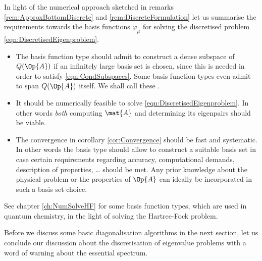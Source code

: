\begin{rem}
	\label{rem:ChoiceBasisFunction}
In light of the numerical approach sketched in
remarks \ref{rem:ApproxBottomDiscrete} and \ref{rem:DiscreteFormulation}
let us summarise the requirements towards the basis functions $\varphi_\mu$
for solving the discretised problem \eqref{eqn:DiscretisedEigenproblem}.
\begin{itemize}
	\item The basis function type should admit
		to construct a dense subspace of $Q(\Op{A})$
		if an infinitely large basis set is chosen,
		since this is needed in order to satisfy \eqref{eqn:CondSubspaces}.
		Some basis function types even admit to span $Q(\Op{A})$ itself.
		We shall call these .
	\item It should be numerically feasible to solve \eqref{eqn:DiscretisedEigenproblem}.
		In other words \emph{both} computing $\mat{A}$
		and determining its eigenpairs
		should be viable.
	\item The convergence in corollary \ref{cor:Convergence}
		should be fast and systematic.
		In other words the basis type should
		allow to construct a suitable basis set
		in case certain requirements
		regarding accuracy, computational demands,
		description of properties, \ldots
		should be met.
		Any prior knowledge about the physical problem
		or the properties of $\Op{A}$ can ideally be incorporated
		in such a basis set choice.
\end{itemize}
See chapter \vref{ch:NumSolveHF} for some basis function types,
which are used in quantum chemistry,
in the light of solving the Hartree-Fock problem.
\end{rem}

Before we discuss some basic diagonalisation
algorithms in the next section,
let us conclude our discussion about the discretisation
of eigenvalue problems
with a word of warning about the essential spectrum.

